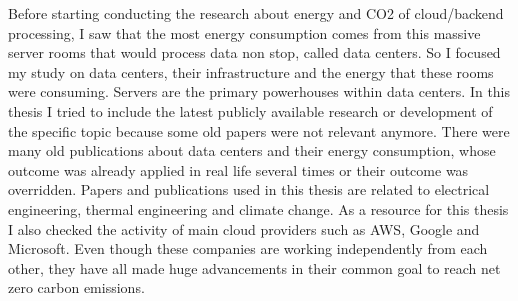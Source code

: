 \documentclass[
  a4paper,  %
  twoside,  %
  bibliography=totoc,
  headsepline,
  cleardoublepage=empty,
  parskip=half,
  draft=false
]{scrbook}
\begin{document}
Before starting conducting the research about energy and CO2 of cloud/backend processing, I saw that the most energy consumption comes from this massive server rooms that would process data non stop, called data centers. So I focused my study on data centers, their infrastructure and the energy that these rooms were consuming. Servers are the primary powerhouses within data centers.
In this thesis I tried to include the latest publicly available research or development of the specific topic because some old papers were not relevant anymore. There were many old publications about data centers and their energy consumption, whose outcome was already applied in real life several times or their outcome was overridden. Papers and publications used in this thesis are related to electrical engineering, thermal engineering and climate change. As a resource for this thesis I also checked the activity of main cloud providers such as AWS, Google and Microsoft. Even though these companies are working independently from each other, they have all made huge advancements in their common goal to reach net zero carbon emissions.



\end{document}
